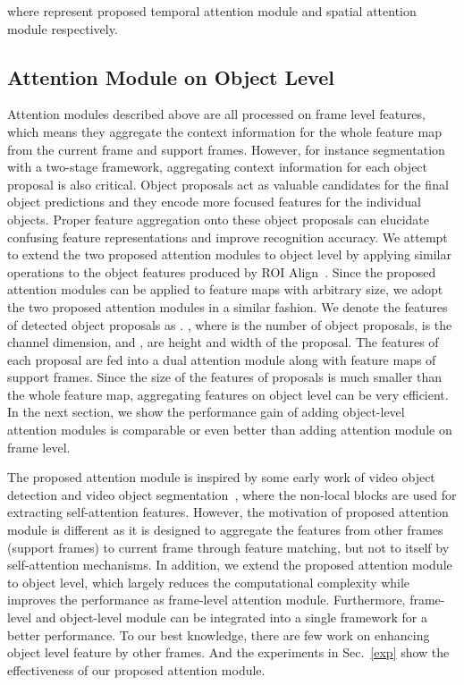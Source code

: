\documentclass[letterpaper]{article} \usepackage{aaai21}  \usepackage{times}  \usepackage{helvet} \usepackage{courier}  \usepackage[hyphens]{url}  \usepackage{graphicx} \urlstyle{rm} \def\UrlFont{\rm}  \usepackage{natbib}  \usepackage{caption} \frenchspacing  \setlength{\pdfpagewidth}{8.5in}  \setlength{\pdfpageheight}{11in}  \newcommand{\etal}{\emph{et al. }}
\begin{document}
where  represent proposed temporal attention module and spatial attention module respectively.

\subsection{Attention Module on Object Level}\label{sec3.4}
Attention modules described above are all processed on frame level features, which means they aggregate the context information for the whole feature map from the current frame and support frames. However, for instance segmentation with a two-stage framework, aggregating context information for each object proposal is also critical. Object proposals act as valuable candidates for the final object predictions and they encode more focused features for the individual objects. Proper feature aggregation onto these object proposals can elucidate confusing feature representations and improve recognition accuracy. We attempt to extend the two proposed attention modules to object level by applying similar operations to the object features produced by ROI Align~\cite{he2017mask}. Since the proposed attention modules can be applied to feature maps with arbitrary size, we adopt the two proposed attention modules in a similar fashion. 
We denote the features of detected object proposals as . , where  is the number of object proposals,  is the channel dimension, and ,  are height and width of the proposal. The features of each proposal are fed into a dual attention module along with feature maps of support frames. Since the size of the features of proposals is much smaller than the whole feature map, aggregating features on object level can be very efficient. In the next section, we show the performance gain of adding object-level attention modules is comparable or even better than adding attention module on frame level. 

The proposed attention module is inspired by some early work of video object detection and video object segmentation~\cite{wu2019long,oh2019video}, where the non-local blocks are used for extracting self-attention features. However, the motivation of proposed attention module is different as it is designed to aggregate the features from other frames (support frames) to current frame through feature matching, but not to itself by self-attention mechanisms. In addition, we extend the proposed attention module to object level, which largely reduces the computational complexity while improves the performance as frame-level attention module. Furthermore, frame-level and object-level module can be integrated into a single framework for a better performance. To our best knowledge, there are few work on enhancing object level feature by other frames. And the experiments in Sec.~\ref{exp} show the effectiveness of our proposed attention module.
\end{document}
